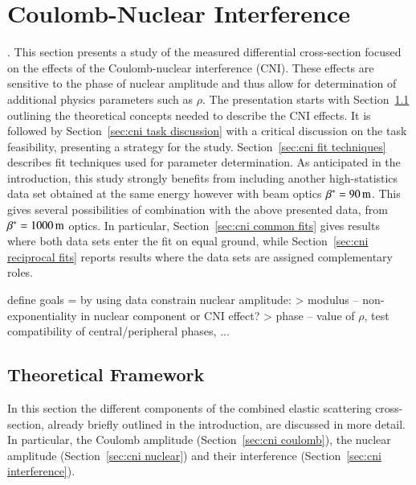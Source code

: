\section{Coulomb-Nuclear Interference}
\label{sec:coulomb}

.
This section presents a study of the measured differential cross-section focused on the effects of the Coulomb-nuclear interference (CNI). These effects are sensitive to the phase of nuclear amplitude and thus allow for determination of additional physics parameters such as $\rho$. The presentation starts with Section~\ref{sec:cni framework} outlining the theoretical concepts needed to describe the CNI effects. It is followed by Section~\ref{sec:cni task discussion} with a critical discussion on the task feasibility, presenting a strategy for the study. Section~\ref{sec:cni fit techniques} describes fit techniques used for parameter determination. As anticipated in the introduction, this study strongly benefits from including another high-statistics data set \cite{8tev-90m} obtained at the same energy however with beam optics $\beta^* = 90\,{\rm m}$. This gives several possibilities of combination with the above presented data, from $\beta^* = 1000\,{\rm m}$ optics. In particular, Section~\ref{sec:cni common fits} gives results where both data sets enter the fit on equal ground, while Section~\ref{sec:cni reciprocal fits} reports results where the data sets are assigned complementary roles.


\> define goals = by using data constrain nuclear amplitude:
\>> modulus -- non-exponentiality in nuclear component or CNI effect?
\>> phase -- value of $\rho$, test compatibility of central/peripheral phases, ...



\subsection{Theoretical Framework}
\label{sec:cni framework}

In this section the different components of the combined elastic scattering cross-section, already briefly outlined in the introduction, are discussed in more detail. In particular, the Coulomb amplitude (Section~\ref{sec:cni coulomb}), the nuclear amplitude (Section~\ref{sec:cni nuclear}) and their interference (Section~\ref{sec:cni interference}).

